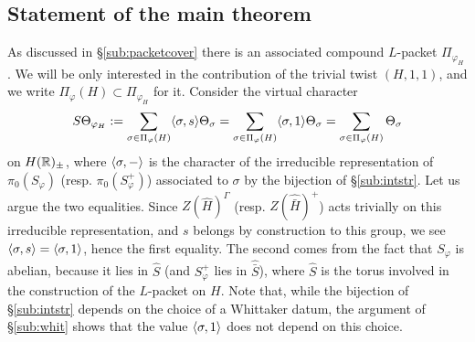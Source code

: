 \documentclass{article}
\theoremstyle{definition}
\numberwithin{equation}{section}
\renewcommand{\-}{\hyp{}}
\newcommand{\warn}[1]{{\leavevmode\color{red}[#1]}}
\begin{document}






\subsection{Statement of the main theorem}

As discussed in \S\ref{sub:packetcover} there is an associated compound $L$\-packet $\Pi_{\varphi_H}$. We will be only interested in the contribution of the trivial twist $(H,1,1)$, and we write $\Pi_\varphi(H) \subset \Pi_{\varphi_H}$ for it. Consider the virtual character
\[ S\Theta_{\varphi_H} := \sum_{\sigma \in \Pi_\varphi(H)} \langle\sigma,s\rangle\Theta_\sigma = \sum_{\sigma \in \Pi_\varphi(H)} \langle\sigma,1\rangle\Theta_\sigma = \sum_{\sigma \in \Pi_\varphi(H)} \Theta_\sigma\]
on $H(\mathbb{R})_\pm$, where $\langle\sigma,-\rangle$ is the character of the irreducible representation of $\pi_0(S_\varphi)$ (resp. $\pi_0(S_\varphi^+)$) associated to $\sigma$ by the bijection of \S\ref{sub:intstr}. Let us argue the two equalities. Since $Z(\hat H)^\Gamma$ (resp. $Z(\hat{\bar H})^+$) acts trivially on this irreducible representation, and $s$ belongs by construction to this group, we see $\langle\sigma,s\rangle=\langle\sigma,1\rangle$, hence the first equality. The second comes from the fact that $S_\varphi$ is abelian, because it lies in $\hat S$ (and $S_\varphi^+$ lies in $\hat{\bar S}$), where $\hat S$ is the torus involved in the construction of the $L$\-packet on $H$. Note that, while the bijection of \S\ref{sub:intstr} depends on the choice of a Whittaker datum, the argument of \S\ref{sub:whit} shows that the value $\langle\sigma,1\rangle$ does not depend on this choice.
\end{document}

